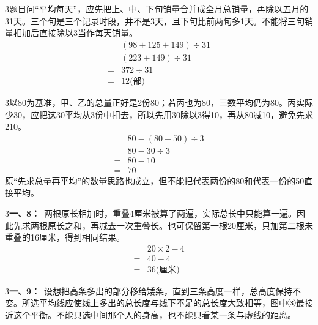 \documentclass[multi=snippet,border={5bp 20bp 5bp 5bp}]{standalone}
\newenvironment{snippet}[3]{\begin{minipage}{#1bp}\color{answerred}\fontsize{#2}{#3}\selectfont\raggedright}{\end{minipage}}
\begin{document}
\begin{snippet}{505}{11.5}{14}\begin{multicols}{3}\raggedcolumns 题目问“平均每天”，应先把上、中、下旬销量合并成全月总销量，再除以五月的31天。三个旬是三个记录时段，并不是3天，且下旬比前两旬多1天。不能将三旬销量相加后直接除以3当作每天销量。\[\begin{aligned}&(98+125+149)\div31\\={}&(223+149)\div31\\={}&372\div31\\={}&12\text{(部)}\end{aligned}\]\end{multicols}\end{snippet}
\begin{snippet}{505}{11.5}{14}\begin{multicols}{3}\raggedcolumns 以80为基准，甲、乙的总量正好是2份80；若丙也为80，三数平均仍为80。丙实际少30，应把这30平均从3份中扣去，所以先用30除以3得10，再从80减10，避免先求210。\[\begin{aligned}&80-(80-50)\div3\\={}&80-30\div3\\={}&80-10\\={}&70\end{aligned}\]原“先求总量再平均”的数量思路也成立，但不能把代表两份的80和代表一份的50直接平均。\end{multicols}\end{snippet}
\begin{snippet}{505}{11.5}{14}\begin{multicols}{3}\raggedcolumns \textbf{一、8：}\ 两根原长相加时，重叠4厘米被算了两遍，实际总长中只能算一遍。因此先求两根原长之和，再减去一次重叠长。也可保留第一根20厘米，只加第二根未重叠的16厘米，得到相同结果。\[\begin{aligned}&20\times2-4\\={}&40-4\\={}&36\text{(厘米)}\end{aligned}\]\end{multicols}\end{snippet}
\begin{snippet}{505}{11.5}{14}\begin{multicols}{3}\raggedcolumns \textbf{一、9：}\ 设想把高条多出的部分移给矮条，直到三条高度一样，总高度保持不变。所选平均线应使线上多出的总长度与线下不足的总长度大致相等，图中③最接近这个平衡。不能只选中间那个人的身高，也不能只看某一条与虚线的距离。\end{multicols}\end{snippet}
\end{document}

